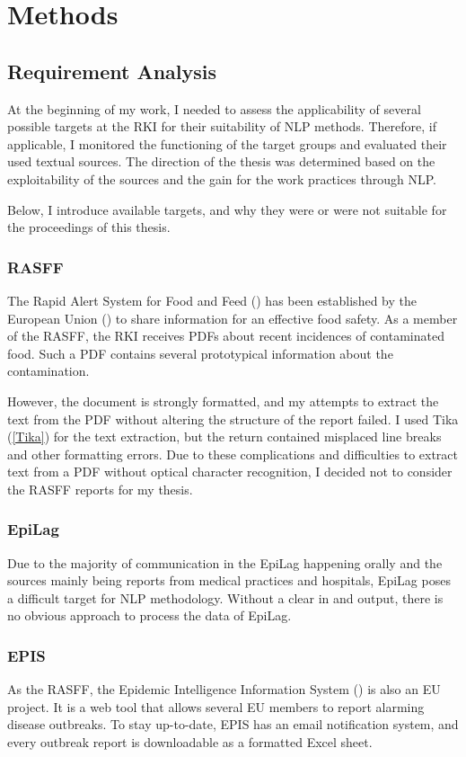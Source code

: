 \chapter{Methods}

\section{Requirement Analysis}
At the beginning of my work, I needed to assess the applicability of several possible targets at the RKI for their suitability of NLP methods.
Therefore, if applicable, I monitored the functioning of the target groups and evaluated their used textual sources.
The direction of the thesis was determined based on the exploitability of the sources and the gain for the work practices through NLP.

Below, I introduce available targets, and why they were or were not suitable for the proceedings of this thesis.

\subsection{RASFF}
The Rapid Alert System for Food and Feed () has been established by the European Union () to share information for an effective food safety. As a member of the RASFF, the RKI receives PDFs about recent incidences of contaminated food. Such a PDF contains several prototypical information about the contamination.

However, the document is strongly formatted, and my attempts to extract the text from the PDF without altering the structure of the report failed. I used Tika (\ref{Tika}) for the text extraction, but the return contained misplaced line breaks and other formatting errors. Due to these complications and difficulties to extract text from a PDF without optical character recognition, I decided not to consider the RASFF reports for my thesis.

\subsection{EpiLag}
Due to the majority of communication in the EpiLag happening orally and the sources mainly being reports from medical practices and hospitals, EpiLag poses a difficult target for NLP methodology.
Without a clear in and output, there is no obvious approach to process the data of EpiLag.

\subsection{EPIS}
As the RASFF, the Epidemic Intelligence Information System () is also an EU project. It is a web tool that allows several EU members to report alarming disease outbreaks. To stay up-to-date, EPIS has an email notification system, and every outbreak report is downloadable as a formatted Excel sheet.


